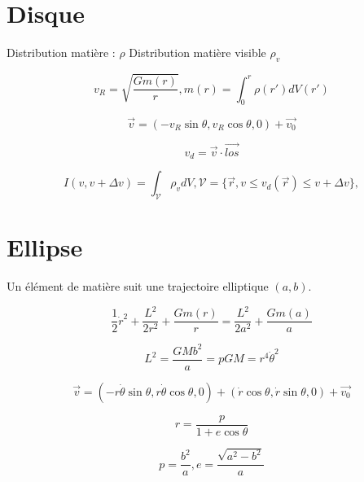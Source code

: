 \documentclass[11pt]{article} %
\title{}
\author{}
\date{} %
\begin{document}
\maketitle

\section*{Disque}

Distribution matière : $\rho$
Distribution matière visible $\rho_v$

\begin{equation}
v_R = \sqrt{\dfrac{Gm(r)}{r}}, m(r) = \int_0^r \rho(r') dV(r')
\end{equation}

\begin{equation}
\vec{v} = (-v_R \sin \theta, v_R \cos \theta, 0)  + \vec{v_0}
\end{equation}

\begin{equation}
v_d = \vec{v} \cdot \vec{los}
\end{equation}

\begin{equation}
I(v, v + \Delta v) = \int_\mathcal{V} \rho_v dV,  \mathcal{V} = \{ \vec{r}, v \leq v_d(\vec{r}) \leq v + \Delta v \}, 
\end{equation}

\section*{Ellipse}

Un élément de matière suit une trajectoire elliptique $(a,b)$. 

\begin{equation}
\dfrac{1}{2}\dot{r}^2 + \dfrac{L^2}{2r^2} + \dfrac{Gm(r)}{r} =  \dfrac{L^2}{2a^2} + \dfrac{Gm(a)}{a}
\end{equation}

\begin{equation}
L^2 = \dfrac{GM b^2}{a} = pGM = r^4 \dot{\theta}^2
\end{equation}

\begin{equation}
\vec{v} = (-r \dot{\theta} \sin \theta, r \dot{\theta} \cos \theta, 0)  + (\dot{r} \cos \theta, \dot{r} \sin \theta, 0) + \vec{v_0}
\end{equation}

\begin{equation}
r = \dfrac{p}{1+e\cos \theta}
\end{equation}

\begin{equation}
p = \dfrac{b^2}{a}, e = \dfrac{\sqrt{a^2-b^2}}{a}
\end{equation}
\end{document}
